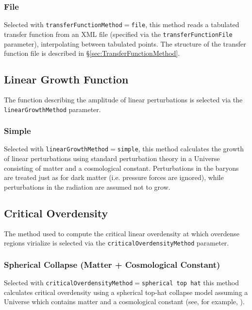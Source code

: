\subsubsection{File}

Selected with {\tt transferFunctionMethod}$=${\tt file}, this method reads a tabulated transfer function from an XML file (specified via the {\tt transferFunctionFile} parameter), interpolating between tabulated points. The structure of the transfer function file is described in \S\ref{sec:TransferFunctionMethod}.

\subsection{Linear Growth Function}

The function describing the amplitude of linear perturbations is selected via the {\tt linearGrowthMethod} parameter.

\subsubsection{Simple}

Selected with {\tt linearGrowthMethod}$=${\tt simple}, this method calculates the growth of linear perturbations using standard perturbation theory in a Universe consisting of matter and a cosmological constant. Perturbations in the baryons are treated just as for dark matter (i.e. pressure forces are ignored), while perturbations in the radiation are assumed not to grow.

\subsection{Critical Overdensity}

The method used to compute the critical linear overdensity at which overdense regions virialize is selected via the {\tt criticalOverdensityMethod} parameter.

\subsubsection{Spherical Collapse (Matter + Cosmological Constant)}

Selected with {\tt criticalOverdensityMethod}$=${\tt spherical top hat} this method calculates critical overdensity using a spherical top-hat collapse model assuming a Universe which contains matter and a cosmological constant (see, for example, \citealt{percival_cosmological_2005}).

